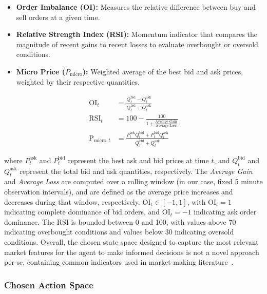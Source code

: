 \begin{itemize}
    \item \textbf{Order Imbalance (OI):} Measures the relative difference between buy and sell orders at a given time.
    \item \textbf{Relative Strength Index (RSI):} Momentum indicator that compares the magnitude of recent gains to recent losses to evaluate overbought or oversold conditions.
    \item \textbf{Micro Price (\( P_{\text{micro}} \)):} Weighted average of the best bid and ask prices, weighted by their respective quantities.
\end{itemize}
\begin{equation}
    \begin{aligned}
        \text{OI}_t &= \frac{Q_t^{\text{bid}} - Q_t^{\text{ask}}}{Q_t^{\text{bid}} + Q_t^{\text{ask}}}\\
        \text{RSI}_t &= 100 - \frac{100}{1 + \frac{\text{Average Gain}}{\text{Average Loss}}}\\
        \text{P}_{\text{micro}, t} &= \frac{P_t^{\text{ask}} Q_t^{\text{bid}} + P_t^{\text{bid}} Q_t^{\text{ask}}}{Q_t^{\text{bid}} + Q_t^{\text{ask}}}
    \end{aligned}
    \label{eq:features}
\end{equation}

where \( P_t^{\text{ask}} \) and \( P_t^{\text{bid}} \) represent the best ask and bid prices at time \( t \),
and \( Q_t^{\text{bid}} \) and \( Q_t^{\text{ask}} \) represent the total bid and ask quantities, respectively.
The \textit{Average Gain} and \textit{Average Loss} are computed over a rolling window (in our case, fixed 5 minute observation intervals),
and are defined as the average price increases and decreases during that window, respectively.
\( \text{OI}_t \in [-1, 1] \), with \( \text{OI}_t = 1 \) indicating complete dominance of bid orders, and \( \text{OI}_t = -1 \) indicating ask order dominance.
The RSI is bounded between 0 and 100, with values above 70 indicating overbought conditions and values below 30 indicating oversold conditions.
Overall, the chosen state space designed to capture the most relevant market features for the agent to make informed decisions is
not a novel approach per-se, containing common indicators used in market-making literature~\cite{Gueant2022, Selser2021a, FalcesMarin2022}.

\subsubsection{Chosen Action Space}

